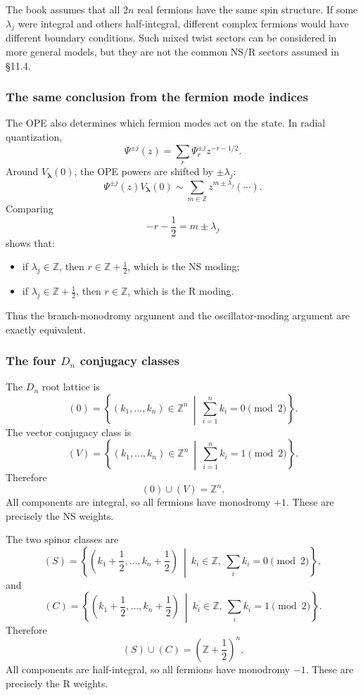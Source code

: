 \documentclass[
  10pt,
  a4paper,
  openany]{book}
\providecommand{\tightlist}{%
  \setlength{\itemsep}{0pt}\setlength{\parskip}{0pt}}
\begin{document}
The book assumes that all \(2n\) real fermions have the same spin
structure. If some \(\lambda_j\) were integral and others half-integral,
different complex fermions would have different boundary conditions.
Such mixed twist sectors can be considered in more general models, but
they are not the common NS/R sectors assumed in §11.4.

\subsubsection{The same conclusion from the fermion mode
indices}\label{the-same-conclusion-from-the-fermion-mode-indices}

The OPE also determines which fermion modes act on the state. In radial
quantization, \[
\Psi^{\pm j}(z)
=
\sum_r\Psi_r^{\pm j}z^{-r-1/2}.
\] Around \(V_{\boldsymbol\lambda}(0)\), the OPE powers are shifted by
\(\pm\lambda_j\): \[
\Psi^{\pm j}(z)V_{\boldsymbol\lambda}(0)
\sim
\sum_{m\in\mathbb Z}
z^{m\pm\lambda_j}(\cdots).
\] Comparing \[
-r-\frac12
=m\pm\lambda_j
\] shows that:

\begin{itemize}
\tightlist
\item
  if \(\lambda_j\in\mathbb Z\), then \(r\in\mathbb Z+\tfrac12\), which
  is the NS moding;
\item
  if \(\lambda_j\in\mathbb Z+\tfrac12\), then \(r\in\mathbb Z\), which
  is the R moding.
\end{itemize}

Thus the branch-monodromy argument and the oscillator-moding argument
are exactly equivalent.

\subsubsection{\texorpdfstring{The four \(D_n\) conjugacy
classes}{The four D\_n conjugacy classes}}\label{the-four-d_n-conjugacy-classes}

The \(D_n\) root lattice is \[
(0)
=
\left\{
(k_1,\ldots,k_n)\in\mathbb Z^n
\ \middle|\
\sum_{i=1}^n k_i=0\pmod2
\right\}.
\] The vector conjugacy class is \[
(V)
=
\left\{
(k_1,\ldots,k_n)\in\mathbb Z^n
\ \middle|\
\sum_{i=1}^n k_i=1\pmod2
\right\}.
\] Therefore \[
\boxed{
(0)\cup(V)=\mathbb Z^n.
}
\] All components are integral, so all fermions have monodromy \(+1\).
These are precisely the NS weights.

The two spinor classes are \[
(S)
=
\left\{
\left(k_1+\frac12,\ldots,k_n+\frac12\right)
\ \middle|\
k_i\in\mathbb Z,\ 
\sum_i k_i=0\pmod2
\right\},
\] and \[
(C)
=
\left\{
\left(k_1+\frac12,\ldots,k_n+\frac12\right)
\ \middle|\
k_i\in\mathbb Z,\ 
\sum_i k_i=1\pmod2
\right\}.
\] Therefore \[
\boxed{
(S)\cup(C)
=
\left(\mathbb Z+\frac12\right)^n.
}
\] All components are half-integral, so all fermions have monodromy
\(-1\). These are precisely the R weights.
\end{document}
